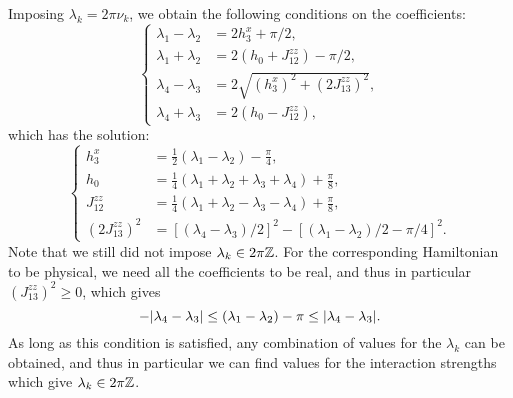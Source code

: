 Imposing $\lambda_k=2\pi\nu_k$, we obtain the following conditions on the coefficients:
\begin{equation}
\begin{cases}
    \lambda_1 - \lambda_2 &= 2 h_3^x + \pi/2, \\
    \lambda_1 + \lambda_2 &= 2(h_0 + J_{12}^{zz}) - \pi/2, \\
    \lambda_4 - \lambda_3 &= 2\sqrt{(h_3^x)^2+ (2J_{13}^{zz})^2}, \\
    \lambda_4 + \lambda_3 &= 2(h_0 - J_{12}^{zz}),
\end{cases}
\label{eq:GL:toffoli_lambdas_vs_parameters}
\end{equation}
which has the solution:
\begin{equation}
\begin{cases}%
    h_3^x &= \frac{1}{2}(\lambda_1 - \lambda_2) - \frac{\pi}{4}, \\
    h_0 &= \frac{1}{4}(\lambda_1 + \lambda_2 + \lambda_3 + \lambda_4) + \frac{\pi}{8}, \\
    J_{12}^{zz} &= \frac{1}{4}(\lambda_1 + \lambda_2 - \lambda_3 - \lambda_4) + \frac{\pi}{8}, \\
    (2J_{13}^{zz})^2 &=
    [(\lambda_4-\lambda_3)/2]^2 -
    [(\lambda_1-\lambda_2)/2 - \pi/4]^2.
\end{cases}
\end{equation}
Note that we still did not impose $\lambda_k\in2\pi\mathbb{Z}$. For the corresponding Hamiltonian to be physical, we need all the coefficients to be real, and thus in particular $(J_{13}^{zz})^2\ge0$, which gives
\begin{equation}
    -\abs{\lambda_4 -\lambda_3} \le
    (\lambda_1 - \lambda_2) - \pi \le \abs{\lambda_4 -\lambda_3}.
    \label{eq:GL:toffoli_lambdas_condition}
\end{equation}
As long as this condition is satisfied, any combination of values for the $\lambda_k$ can be obtained, and thus in particular we can find values for the interaction strengths which give $\lambda_k\in2\pi\mathbb{Z}$.


